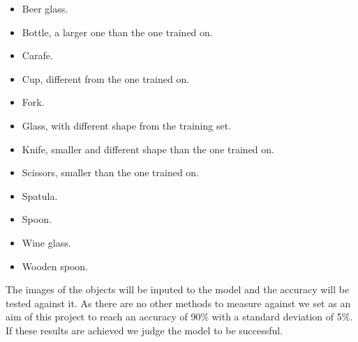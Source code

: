 \begin{itemize}
	\item Beer glass.
	\item Bottle, a larger one than the one trained on.
	\item Carafe.
	\item Cup, different from the one trained on.
	\item Fork.
	\item Glass, with different shape from the training set.
	\item Knife, smaller and different shape than the one trained on.
	\item Scissors, smaller than the one trained on.
	\item Spatula.
	\item Spoon.
	\item Wine glass.
	\item Wooden spoon.
\end{itemize}

The images of the objects will be inputed to the model and the accuracy will be tested against it. As there are no other methods to measure against we set as an aim of this project to reach an accuracy of 90\% with a standard deviation of 5\%. If these results are achieved we judge the model to be successful.
